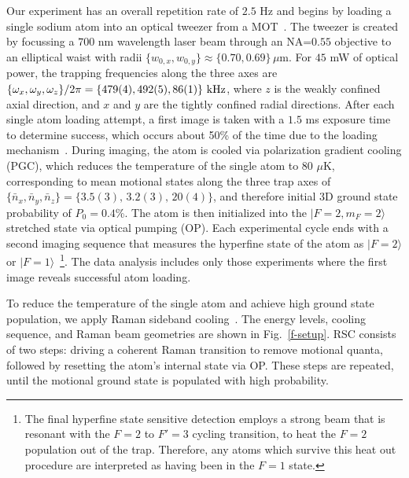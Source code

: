 \documentclass[aps,prl,twocolumn,groupedaddress]{revtex4-1}
\begin{document}
Our experiment has an overall repetition rate of $2.5$ Hz and
begins by loading a single sodium atom into an optical tweezer from a MOT~\cite{Hutzler2017-LightShifts}.
The tweezer is created by focussing a $700$ nm wavelength laser beam through an NA=$0.55$ objective to an elliptical waist with radii $\{w_{0,x},w_{0,y}\}\approx \{0.70,0.69\}\,\mu$m.
For $45$ mW of optical power, the trapping frequencies along the three axes are
$\{\omega_x,\omega_y,\omega_z\}/2\pi = \{479(4), 492(5), 86(1)\}\ \text{\text{kHz}}$,
where $z$ is the weakly confined axial direction,
and $x$ and $y$ are the tightly confined radial directions.
After each single atom loading attempt, a first image is taken with a $1.5$ ms exposure time
to determine success, which occurs about 50\% of the time due to the loading mechanism~\cite{Schlosser2001}.
During imaging, the atom is cooled via polarization gradient cooling (PGC),
which reduces the temperature of the single atom to $80$ $\mu$K,
corresponding to mean motional states along the three trap axes of
$\{\bar n_x, \bar n_y, \bar n_z\}=\{3.5(3),\, 3.2(3),\, 20(4)\}$, and therefore initial 3D ground state probability of $P_0=0.4$\%.
The atom is then initialized into
the $|F=2, m_F=2\rangle$ stretched state via optical pumping (OP).
Each experimental cycle ends with a second imaging sequence that measures the hyperfine state of the atom as $|F=2\rangle$ or $|F=1\rangle$~\footnote{The final hyperfine state sensitive detection employs a strong beam that is resonant with the $F=2$ to $F'=3$ cycling transition, to heat the $F=2$ population out of the trap. Therefore, any atoms which survive this heat out procedure are interpreted as having been in the $F=1$ state.}. The data analysis includes only those experiments where the first image reveals successful atom loading.

To reduce the temperature of the single atom and
 achieve high ground state population, we apply Raman sideband cooling~\cite{Monroe1995, Kaufman2012}.
The energy levels, cooling sequence, and Raman beam geometries
are shown in Fig.~\ref{f-setup}. RSC consists of two steps:
driving a coherent Raman transition to remove motional quanta, followed by resetting the atom's internal state via OP.
These steps are repeated, until the motional ground state is populated with high probability.
\end{document}
